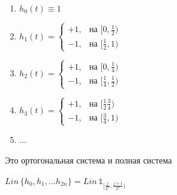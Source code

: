 \begin{example}
\begin{enumerate}
{            \begin{enumerate}
                \item {
                    $h_0 (t) \equiv 1$
                }
                \item {
                    $h_1 (t) = \begin{cases}
                        +1, & \text{на $[0, \frac{1}{2})$} \\
                        -1, & \text{на $[\frac{1}{2}, 1)$}
                    \end{cases}$
                }
                \item {
                    $h_2 (t) = \begin{cases}
                        +1, & \text{на $[0, \frac{1}{4})$} \\
                        -1, & \text{на $[\frac{1}{4}, \frac{1}{2})$}
                    \end{cases}$
                }
                \item {
                    $h_3 (t) = \begin{cases}
                        +1, & \text{на $[\frac{1}{2} \frac{3}{4})$} \\
                        -1, & \text{на $[\frac{3}{4}, 1)$}
                    \end{cases}$
                }
                \item {
                    $\ldots$
                }
            \end{enumerate}
        }
    \end{enumerate}

    Это ортогональная система и полная система

    $Lin \, \{ h_0, h_1, \ldots h_{2n} \} = Lin \, \mathds{1}_{[\frac{j}{2^n}, \frac{j + 1}{2^n})}$
\end{example}

